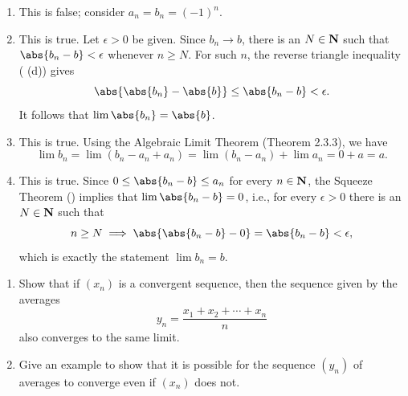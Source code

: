 \documentclass{lew98_solutions}
\begin{document}
\begin{solution}
    \begin{enumerate}
        \item This is false; consider \( a_n = b_n = (-1)^n \).

        \item This is true. Let \( \epsilon > 0 \) be given. Since \( b_n \to b \), there is an \( N \in \mathbf{N} \) such that \( \abs{b_n - b} < \epsilon \) whenever \( n \geq N \). For such \( n \), the reverse triangle inequality ( (d)) gives
        \[
            \abs{\abs{b_n} - \abs{b}} \leq \abs{b_n - b} < \epsilon.
        \]
        It follows that \( \lim \abs{b_n} = \abs{b} \).

        \item This is true. Using the Algebraic Limit Theorem (Theorem 2.3.3), we have
        \[
            \lim b_n = \lim (b_n - a_n + a_n) = \lim (b_n - a_n) + \lim a_n = 0 + a = a.
        \]

        \item This is true. Since \( 0 \leq \abs{b_n - b} \leq a_n \) for every \( n \in \mathbf{N} \), the Squeeze Theorem () implies that \( \lim \abs{b_n - b} = 0 \), i.e., for every \( \epsilon > 0 \) there is an \( N \in \mathbf{N} \) such that
        \[
            n \geq N \implies \abs{\abs{b_n - b} - 0} = \abs{b_n - b} < \epsilon,
        \]
        which is exactly the statement \( \lim b_n = b \).
    \end{enumerate}
\end{solution}

\begin{exercise}
\label{ex:2.3.11}
    \begin{enumerate}
        \item Show that if \( (x_n) \) is a convergent sequence, then the sequence given by the averages
        \[
            y_n = \frac{x_1 + x_2 + \cdots + x_n}{n}
        \]
        also converges to the same limit.

        \item Give an example to show that it is possible for the sequence \( (y_n) \) of averages to converge even if \( (x_n) \) does not.
    \end{enumerate}
\end{exercise}
\end{document}
